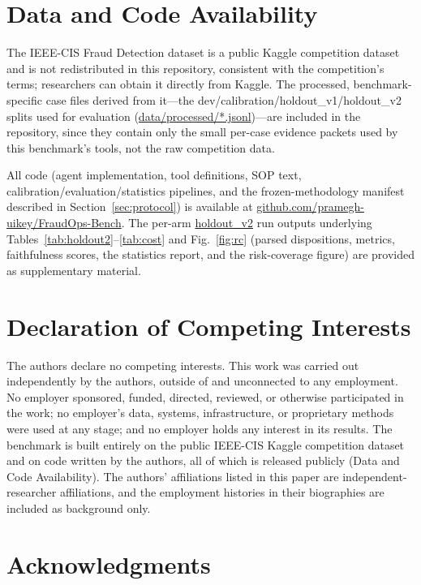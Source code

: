 \documentclass[]{ieeeaccess}
\newcommand{\code}[1]{\url{#1}}
\begin{document}
\section*{Data and Code Availability}

The IEEE-CIS Fraud Detection dataset is a public Kaggle competition
dataset \cite{ieeecis2019} and is not redistributed in this repository,
consistent with the competition's terms; researchers can obtain it
directly from Kaggle. The processed, benchmark-specific case files
derived from it---the dev/calibration/holdout\_v1/holdout\_v2 splits
used for evaluation (\code{data/processed/*.jsonl})---are included in
the repository, since they contain only the small per-case evidence
packets used by this benchmark's tools, not the raw competition data.

All code (agent implementation, tool definitions, SOP text,
calibration/evaluation/statistics pipelines, and the frozen-methodology
manifest described in Section~\ref{sec:protocol}) is available at
\code{github.com/pramegh-uikey/FraudOps-Bench}. The per-arm
\code{holdout_v2} run outputs underlying Tables~\ref{tab:holdout2}--\ref{tab:cost}
and Fig.~\ref{fig:rc} (parsed dispositions, metrics, faithfulness scores,
the statistics report, and the risk-coverage figure) are provided as
supplementary material.

\section*{Declaration of Competing Interests}

The authors declare no competing interests. This work was carried out
independently by the authors, outside of and unconnected to any
employment. No employer sponsored, funded, directed, reviewed, or
otherwise participated in the work; no employer's data, systems,
infrastructure, or proprietary methods were used at any stage; and no
employer holds any interest in its results. The benchmark is built
entirely on the public IEEE-CIS Kaggle competition dataset
\cite{ieeecis2019} and on code written by the authors, all of which is
released publicly (Data and Code Availability). The authors' affiliations
listed in this paper are independent-researcher affiliations, and the
employment histories in their biographies are included as background
only.

\section*{Acknowledgments}
\end{document}
